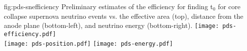 \begin{dunefigure}{fig:pds-snefficiency}
{Preliminary estimates of the efficiency for finding t$_0$ for core collapse supernova neutrino events vs. the effective area (top), distance from the anode plane (bottom-left), and neutrino energy (bottom-right).}
  \texttt{[image: pds-efficiency.pdf]}\\
  \texttt{[image: pds-position.pdf]}
  \texttt{[image: pds-energy.pdf]}
\end{dunefigure}


